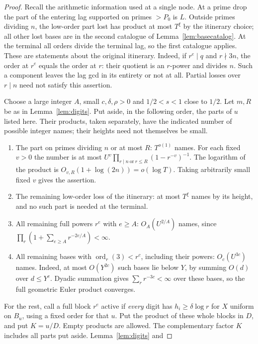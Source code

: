 \begin{proof}
Recall the arithmetic information used at a single node. At a prime
drop the part of the entering lag supported on primes $>P_0$ is $L$.
Outside primes dividing $n$, the low-order part lost has product at
most $T^\xi$ by the itinerary choice; all other lost bases are in
the second catalogue of Lemma~\ref{lem:basecatalog}. At the terminal
all orders divide the terminal lag, so the first catalogue applies.
These are statements about the original itinerary. Indeed, if
$r^e\mid q$ and $r\nmid 3n$, the order at $r^e$ equals the order at
$r$: their quotient is an $r$-power and divides $n$. Such a component
leaves the lag gcd in its entirety or not at all. Partial losses over
$r\mid n$ need not satisfy this assertion.

Choose a large integer $A$, small $c,\delta,\rho>0$ and
$1/2<s<1$ close to $1/2$. Let $m,R$ be as in Lemma~\ref{lem:digits}.
Put aside, in the following order, the parts of $u$ listed here.
Their products, taken separately, have the indicated number of
possible integer names; their heights need not themselves be small.
\begin{enumerate}
\item The part on primes dividing $n$ or at most $R$: $T^{o(1)}$ names.
For each fixed $v>0$ the number is at most
$U^v\prod_{r\mid n\ \mathrm{or}\ r\le R}(1-r^{-v})^{-1}$.
The logarithm of the product is $O_{v,R}(1+\log(2n))=o(\log T)$.
Taking arbitrarily small fixed $v$ gives the assertion.
\item The remaining low-order loss of the itinerary: at most $T^\xi$
names by its height, and no such part is needed at the terminal.
\item All remaining full powers $r^e$ with $e\ge A$: $O_A(U^{2/A})$
names, since
$\prod_r(1+\sum_{e\ge A}r^{-2e/A})<\infty$.
\item All remaining bases with $\operatorname{ord}_r(3)<r^c$,
including their powers: $O_c(U^{3c})$ names. Indeed, at most
$O(Y^{2c})$ such bases lie below $Y$, by summing $O(d)$ over
$d\le Y^c$. Dyadic summation gives $\sum_r r^{-3c}<\infty$
over these bases, so the full geometric Euler product converges.
\end{enumerate}
For the rest, call a full block $r^e$ active if \emph{every} digit
has $h_i\ge\delta\log r$ for $X$ uniform on $B_u$, using a fixed
order for that $u$. Put the product of these whole blocks in $D$, and
put $K=u/D$. Empty products are allowed. The complementary factor
$K$ includes all parts put aside. Lemma~\ref{lem:digits} and

\end{proof}
